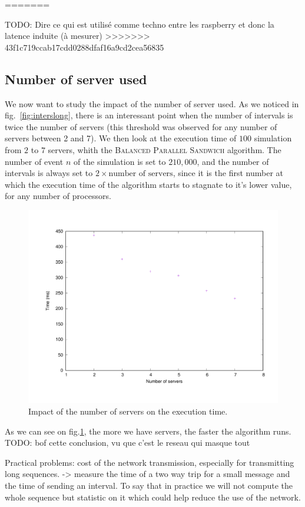 \documentclass[a4paper,10pt]{article}
\newcommand{\todo}[1]{{\color{red} TODO: {#1}}}
\begin{document}
=======

\todo{Dire ce qui est utilisé comme techno entre les raspberry et donc la latence induite (à mesurer)}
>>>>>>> 43f1c719ccab17cdd0288dfaf16a9cd2cea56835

\subsection{Number of server used}
We now want to study the impact of the number of server used. As we noticed in fig.~\ref{fig:interslong}, there is an interessant point when the number of intervals is twice the number of servers (this threshold was observed for any number of servers between 2 and 7). We then look at the execution time of $100$ simulation from $2$ to $7$ servers, whith the \textsc{Balanced Parallel Sandwich} algorithm. The number of event $n$ of the simulation is set to $210,000$, and the number of intervals is always set to $2 \times \textrm{number of servers}$, since it is the first number at which the execution time of the algorithm starts to stagnate to it's lower value, for any number of processors.

\begin{figure}[H]
\centering
\label{fig:nbservs}
 \includegraphics[scale=0.45]{numberofservers.pdf}
 \caption{Impact of the number of servers on the execution time.}
\end{figure}

As we can see on fig.\ref{fig:nbservs}, the more we have servers, the faster the algorithm runs.
\todo{bof cette conclusion, vu que c'est le reseau qui masque tout}

Practical problems: cost of the network transmission, especially for transmitting long sequences.
-> measure the time of a two way trip for a small message and the time of sending an interval.
To say that in practice we will not compute the whole sequence but statistic on it which could help
reduce the use of the network.
\end{document}
